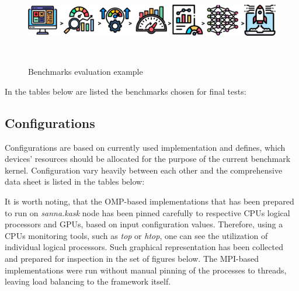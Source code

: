 \begin{figure}[h!]
    \centering
    \includegraphics[width=\textwidth,height=\textheight,keepaspectratio]{figures/benchmarks/Benchmarks.png}
    \caption{Benchmarks evaluation example}~\label{fig:benchmarks}
\end{figure}

In the tables below are listed the benchmarks chosen for final tests:



\newpage

\subsection{Configurations}
Configurations are based on currently used implementation and defines, which
devices' resources should be allocated for the purpose of the current
benchmark kernel. Configuration vary heavily between each other and the
comprehensive data sheet is listed in the tables below:





It is worth noting, that the OMP-based implementations that has been prepared
to run on \emph{sanna.kask} node has been pinned carefully to respective CPUs
logical processors and GPUs, based on input configuration values. Therefore,
using a CPUs monitoring tools, such as \emph{top} or \emph{htop}, one can see
the utilization of individual logical processors. Such graphical representation
has been collected and prepared for inspection in the set of figures below.
The MPI-based implementations were run without manual pinning of the processes
to threads, leaving load balancing to the framework itself.

